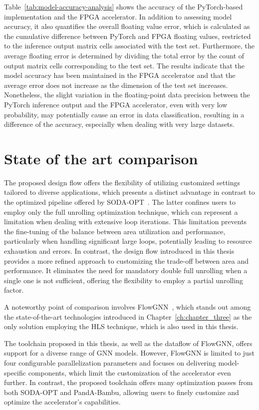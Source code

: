 Table~\ref{tab:model-accuracy-analysis} shows the accuracy of the PyTorch-based implementation and the FPGA accelerator.
In addition to assessing model accuracy, it also quantifies the overall floating value error, which is calculated as the cumulative difference between PyTorch and FPGA floating values, restricted to the inference output matrix cells associated with the test set.
Furthermore, the average floating error is determined by dividing the total error by the count of output matrix cells corresponding to the test set.
The results indicate that the model accuracy has been maintained in the FPGA accelerator and that the average error does not increase as the dimension of the test set increases.
Nonetheless, the slight variation in the floating-point data precision between the PyTorch inference output and the FPGA accelerator, even with very low probability, may potentially cause an error in data classification, resulting in a difference of the accuracy, especially when dealing with very large datasets.

\section{State of the art comparison}
\label{sec:sota-comparison}%

The proposed design flow offers the flexibility of utilizing customized settings tailored to diverse applications, which presents a distinct advantage in contrast to the optimized pipeline offered by SODA-OPT~\cite{9786533}.
The latter confines users to employ only the full unrolling optimization technique, which can represent a limitation when dealing with extensive loop iterations.
This limitation prevents the fine-tuning of the balance between area utilization and performance, particularly when handling significant large loops, potentially leading to resource exhaustion and errors.
In contrast, the design flow introduced in this thesis provides a more refined approach to customizing the trade-off between area and performance.
It eliminates the need for mandatory double full unrolling when a single one is not sufficient, offering the flexibility to employ a partial unrolling factor.

A noteworthy point of comparison involves FlowGNN~\cite{sarkar2022flowgnn}, which stands out among the state-of-the-art technologies introduced in Chapter~\ref{ch:chapter_three} as the only solution employing the HLS technique, which is also used in this thesis.

The toolchain proposed in this thesis, as well as the dataflow of FlowGNN, offers support for a diverse range of GNN models.
However, FlowGNN is limited to just four configurable parallelization parameters and focuses on delivering model-specific components, which limit the customization of the accelerator even further.
In contrast, the proposed toolchain offers many optimization passes from both SODA-OPT and PandA-Bambu, allowing users to finely customize and optimize the accelerator's capabilities.

